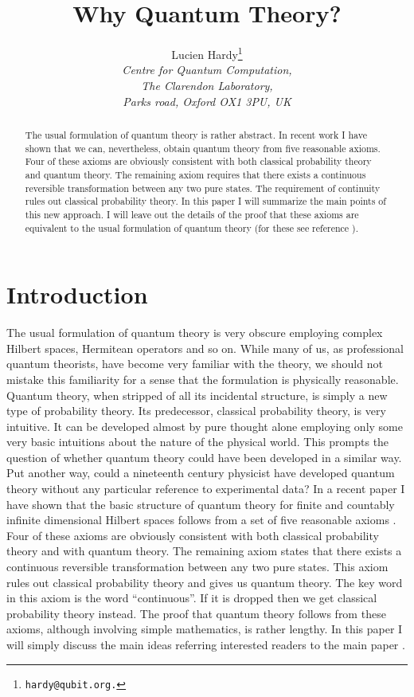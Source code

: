 \documentclass[10pt]{article}
\title{\textbf{Why Quantum Theory?}}
\author{Lucien Hardy\thanks{\texttt{hardy@qubit.org.}}\\
\textit{Centre for Quantum Computation,}\\
\textit{The Clarendon Laboratory,}\\
\textit{Parks road, Oxford OX1 3PU, UK}}
\begin{document}
\setlength{\textwidth}{12.5cm}
\setlength{\textheight}{19cm}


\maketitle

\begin{abstract}
The usual formulation of quantum theory is rather abstract.  In recent
work I have shown that we can, nevertheless, obtain quantum theory from
five reasonable axioms.  Four of these axioms are obviously consistent
with both classical probability theory and quantum theory.  The
remaining axiom requires that there exists a continuous reversible
transformation between any two pure states.  The requirement of
continuity rules out classical probability theory.  In this paper I will
summarize the main points of this new approach.  I will leave out the
details of the proof that these axioms are equivalent to the usual
formulation of quantum theory (for these see reference \cite{Hardy1}).
\end{abstract}

\section{Introduction}

The usual formulation of quantum theory is
very obscure employing complex Hilbert spaces, Hermitean operators and
so on.  While many of us, as professional quantum theorists, have
become very familiar with the theory, we should not mistake this familiarity
for a sense that the formulation is physically  reasonable.
Quantum theory, when stripped of all
its incidental structure, is simply a new type of probability theory.
Its predecessor, classical probability theory, is very intuitive.  It
can be developed almost by pure thought alone employing only some very
basic intuitions about the nature of the physical world.  This prompts
the question of whether quantum theory could have been developed in a
similar way. Put another way, could a nineteenth century physicist have
developed quantum theory without any particular reference to
experimental data?  In a recent paper
I have shown that the basic structure of quantum theory
for finite and countably infinite dimensional Hilbert spaces follows
from a set of five reasonable axioms \cite{Hardy1}.  Four of these
axioms are obviously consistent with both classical probability theory
and with quantum theory.  The remaining axiom states that there exists a
continuous reversible transformation between any two pure states.  This
axiom rules out classical probability theory and gives us quantum
theory.  The key word in this axiom is the word ``continuous''.  If it
is dropped then we get classical probability theory instead.
The proof that quantum theory follows from these axioms, although
involving simple mathematics, is rather lengthy.  In this paper I will
simply discuss the main ideas referring interested readers
to the main paper \cite{Hardy1}.
\end{document}
